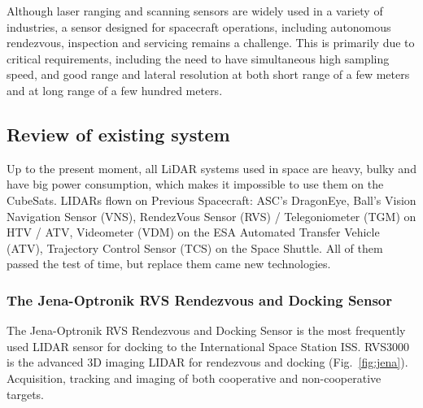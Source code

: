 Although laser ranging and scanning sensors are widely used in a variety of industries, a sensor designed for spacecraft
operations, including autonomous rendezvous, inspection and servicing remains a challenge. This is primarily due to
critical requirements, including the need to have simultaneous high sampling speed, and good range and lateral
resolution at both short range of a few meters and at long range of a few hundred meters.

\subsection{Review of existing system}

Up to the present moment, all LiDAR systems used in space are heavy, bulky and have big power
consumption, which makes it impossible to use them on the CubeSats. 
LIDARs flown on Previous Spacecraft:
ASC’s DragonEye,  Ball’s Vision Navigation Sensor (VNS), RendezVous Sensor (RVS) / Telegoniometer (TGM) on HTV / ATV, Videometer (VDM) on the ESA Automated Transfer Vehicle (ATV), Trajectory Control Sensor (TCS) on the Space Shuttle. All of them passed the test of time, but replace them came new technologies.

\subsubsection{The Jena-Optronik RVS Rendezvous and Docking Sensor}
The Jena-Optronik RVS Rendezvous and Docking Sensor is the most frequently used LIDAR
sensor for docking to the International Space Station ISS.
RVS3000  is the advanced 3D imaging LIDAR for rendezvous and docking (Fig.~\ref{fig:jena}).
Acquisition, tracking and imaging of both cooperative and non-cooperative targets.

\begin{figure}[H]
\begin{floatrow}
\end{floatrow}
\end{figure}

